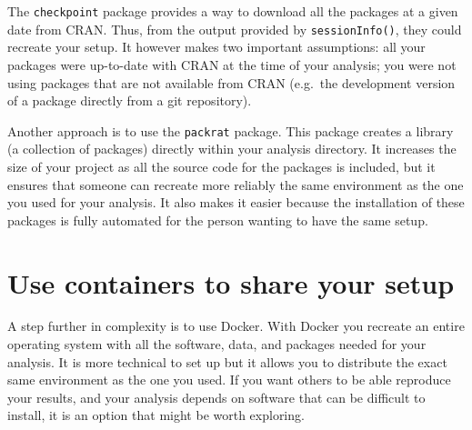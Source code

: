 \documentclass[
]{book}
\begin{document}
The \texttt{checkpoint} package provides a way to download all the packages at a given date from CRAN. Thus, from the output provided by \texttt{sessionInfo()}, they could recreate your setup. It however makes two important assumptions: all your packages were up-to-date with CRAN at the time of your analysis; you were not using packages that are not available from CRAN (e.g.~the development version of a package directly from a git repository).

Another approach is to use the \texttt{packrat} package. This package creates a library (a collection of packages) directly within your analysis directory. It increases the size of your project as all the source code for the packages is included, but it ensures that someone can recreate more reliably the same environment as the one you used for your analysis. It also makes it easier because the installation of these packages is fully automated for the person wanting to have the same setup.

\hypertarget{use-containers-to-share-your-setup}{%
\section{Use containers to share your setup}\label{use-containers-to-share-your-setup}}

A step further in complexity is to use Docker. With Docker you recreate an entire operating system with all the software, data, and packages needed for your analysis. It is more technical to set up but it allows you to distribute the exact same environment as the one you used. If you want others to be able reproduce your results, and your analysis depends on software that can be difficult to install, it is an option that might be worth exploring.

  
\end{document}
